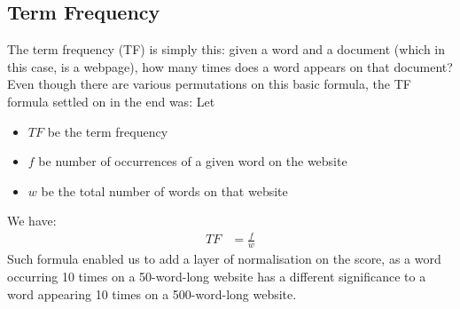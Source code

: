 \subsection{Term Frequency}
The term frequency (TF) is simply this: given a word and a document (which in this case, is a webpage), how many times does a word appears on that document?\newline
Even though there are various permutations on this basic formula, the TF formula settled on in the end was:\newline
Let
\begin{itemize}
    \item $TF$ be the term frequency
    \item $f$ be number of occurrences of a given word on the website
    \item $w$ be the total number of words on that website
\end{itemize}
We have:
\begin{align}
    TF &= \frac{f}{w}
    \label{eq:TF}
\end{align}
Such formula enabled us to add a layer of normalisation on the score, as a word occurring 10 times on a 50-word-long website has a different significance to a word appearing 10 times on a 500-word-long website.

